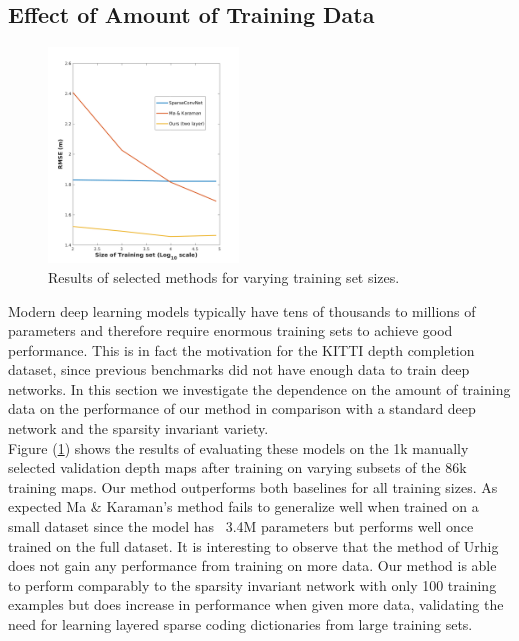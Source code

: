 \subsection{Effect of Amount of Training Data}
\label{sec:effect-training-data}
\begin{figure}
\centering
\includegraphics[width=0.45\textwidth]{trainsizeplot}
  \caption{Results of selected methods for varying training set sizes.}
  \label{fig:trainsize}
\end{figure}
Modern deep learning models typically have tens of thousands to millions of parameters and therefore require enormous training sets to achieve good performance. This is in fact the motivation for the KITTI depth completion dataset, since previous benchmarks did not have enough data to train deep networks. In this section we investigate the dependence on the amount of training data on the performance of our method in comparison with a standard deep network and the sparsity invariant variety.\\
Figure (\ref{fig:trainsize}) shows the results of evaluating these models on the 1k manually selected validation depth maps after training on varying subsets of the 86k training maps. Our method outperforms both baselines for all training sizes. As expected Ma \& Karaman's method fails to generalize well when trained on a small dataset since the model has ~3.4M parameters but performs well once trained on the full dataset. It is interesting to observe that the method of Urhig \etal does not gain any performance from training on more data. Our method is able to perform comparably to the sparsity invariant network with only 100 training examples but does increase in performance when given more data, validating the need for learning layered sparse coding dictionaries from large training sets. 
